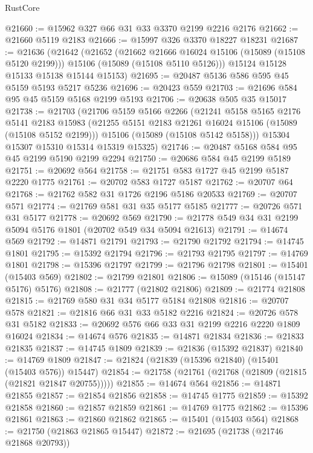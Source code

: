 \begin{lexlean}{RustCore}
\begin{coremodule}
@21660 := @15962 @327 @66 @31 @33 @3370 @2199 @2216 @2176
@21662 := @21660 @5119 @2183
@21666 := @15997 @326 @3370 @18227 @18231
@21687 := @21636
    (@21642
      (@21652
        (@21662 @21666 @16024 @15106 (@15089 (@15108 @5120 @2199)))
        @15106
        (@15089 (@15108 @5110 @5126)))
      @15124
      @15128
      @15133
      @15138
      @15144
      @15153)
@21695 := @20487 @5136 @586 @595 @45 @5159 @5193 @5217 @5236
@21696 := @20423 @559
@21703 := @21696 @584 @95 @45 @5159 @5168 @2199 @5193
@21706 := @20638 @505 @35 @15017
@21738 := @21703
    (@21706
      @5159
      @5166
      @2266
      (@21241
        @5158
        @5165
        @2176
        @5141
        @2183
        @15983
        (@21255 @5151 @2183 @21261 @16024 @15106 (@15089 (@15108 @5152 @2199)))
        @15106
        (@15089 (@15108 @5142 @5158)))
      @15304
      @15307
      @15310
      @15314
      @15319
      @15325)
@21746 := @20487 @5168 @584 @95 @45 @2199 @5190 @2199 @2294
@21750 := @20686 @584 @45 @2199 @5189
@21751 := @20692 @564
@21758 := @21751 @583 @1727 @45 @2199 @5187 @2220 @1775
@21761 := @20702 @583 @1727 @5187
@21762 := @20707 @64
@21768 := @21762 @582 @31 @1726 @2196 @5186 @20533
@21769 := @20707 @571
@21774 := @21769 @581 @31 @35 @5177 @5185
@21777 := @20726 @571 @31 @5177
@21778 := @20692 @569
@21790 := @21778 @549 @34 @31 @2199 @5094 @5176 @1801 (@20702 @549 @34 @5094 @21613)
@21791 := @14674 @569
@21792 := @14871 @21791
@21793 := @21790 @21792
@21794 := @14745 @1801
@21795 := @15392 @21794
@21796 := @21793 @21795
@21797 := @14769 @1801
@21798 := @15396 @21797
@21799 := @21796 @21798
@21801 := @15401 (@15403 @569)
@21802 := @21799 @21801
@21806 := @15089 (@15146 (@15147 @5176) @5176)
@21808 := @21777 (@21802 @21806)
@21809 := @21774 @21808
@21815 := @21769 @580 @31 @34 @5177 @5184 @21808
@21816 := @20707 @578
@21821 := @21816 @66 @31 @33 @5182 @2216
@21824 := @20726 @578 @31 @5182
@21833 := @20692 @576 @66 @33 @31 @2199 @2216 @2220 @1809 @16024
@21834 := @14674 @576
@21835 := @14871 @21834
@21836 := @21833 @21835
@21837 := @14745 @1809
@21839 := @21836 (@15392 @21837)
@21840 := @14769 @1809
@21847 := @21824 (@21839 (@15396 @21840) (@15401 (@15403 @576)) @15447)
@21854 := @21758 (@21761 (@21768 (@21809 (@21815 (@21821 @21847 @20755)))))
@21855 := @14674 @564
@21856 := @14871 @21855
@21857 := @21854 @21856
@21858 := @14745 @1775
@21859 := @15392 @21858
@21860 := @21857 @21859
@21861 := @14769 @1775
@21862 := @15396 @21861
@21863 := @21860 @21862
@21865 := @15401 (@15403 @564)
@21868 := @21750 (@21863 @21865 @15447)
@21872 := @21695 (@21738 (@21746 @21868 @20793))

\end{coremodule}
\end{lexlean}
